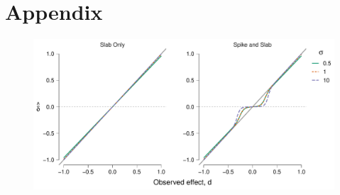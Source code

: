 \documentclass[a4paper]{article}
\newenvironment{revision}{\color{teal}}{\color{black}}
\begin{document}
\newpage

%
%
\printbibliography


\appendix
\begin{revision}%

\section*{Appendix}

\begin{figure}[!ht]
	\includegraphics[width=\textwidth]{posteriorMeanVsSampleDelta_sigma_n_100.pdf}
\end{figure}
\end{revision}
\end{document}
